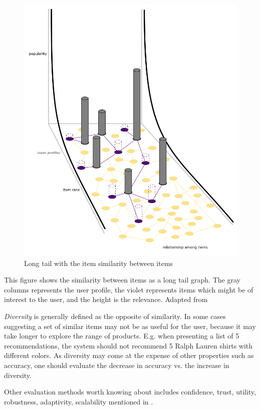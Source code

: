 \begin{figure}[H]
    \centering
    \includegraphics[scale=0.4]{image/longtailNoveltyFig.png}
    \caption{Long tail with the item similarity between items~\cite{celma2008}}
    \label{figure:longtailNovelty}
\end{figure}

This figure shows the similarity between items as a long tail graph. The gray
columns represents the user profile, the violet represents items which might be
of interest to the user, and the height is the relevance. Adapted
from~\cite{celma2008}

\textit{Diversity} is generally defined as the opposite of similarity. In some
cases suggesting a set of similar items may not be as useful for the user,
because it may take longer to explore the range of products. E.g. when
presenting a list of 5 recommendations, the system should not recommend 5 Ralph
Lauren shirts with different colors. As diversity may come at the expense of
other properties such as accuracy, one should evaluate the decrease in accuracy
vs. the increase in diversity.

Other evaluation methods worth knowing about includes confidence, trust,
utility, robustness, adaptivity, scalability mentioned in \cite{Herlocker2004,
Shani2011}.

